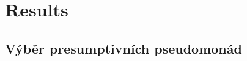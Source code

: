 \chapter{Results}

\shorthandoff{-} 

\section{Výběr presumptivních pseudomonád}



\shorthandon{-} 


